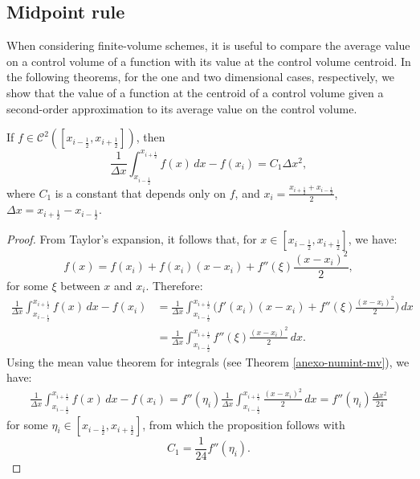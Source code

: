 \subsection{Midpoint rule}
When considering finite-volume schemes, it is useful to compare the average value on a  control volume 
of a function with its value at the  control volume centroid. 
In the following theorems, for the one and two dimensional cases, respectively,
we show that the value of a function at the centroid of a control volume given a second-order approximation to its average value
on the control volume.
\begin{thrm}
	\label{prop-bound-midpoint1d}
	If $f \in \mathcal{C}^2([x_{i-\frac{1}{2}},x_{i+\frac{1}{2}}])$, then 
	\begin{equation}
		\frac{1}{\Delta x}\int_{x_{i-\frac{1}{2}}}^{x_{i+\frac{1}{2}}}{f(x)\,dx}-f(x_i) = C_1 \Delta x^2, 
	\end{equation}
	where $C_1$ is a constant that depends only on $f$, and $x_i = \frac{x_{i+\frac{1}{2}} + x_{i-\frac{1}{2}}}{2}$,
	$\Delta x = x_{i+\frac{1}{2}}-x_{i-\frac{1}{2}}$.
\end{thrm}
\begin{proof}
	From Taylor's expansion, it follows that, for $x \in [x_{i-\frac{1}{2}},x_{i+\frac{1}{2}}]$, we have:
	\begin{equation}
		f(x) = f(x_i) +  f(x_i)(x-x_i) + f''(\xi)\frac{(x-x_i)^2}{2},
	\end{equation}
	for some $\xi$ between $x$ and $x_i$. Therefore:
	\begin{align*}
		\frac{1}{\Delta x} \int_{x_{i-\frac{1}{2}}}^{x_{i+\frac{1}{2}}} {f(x)\,dx} - f(x_i)  
		&= \frac{1}{\Delta x} \int_{x_{i-\frac{1}{2}}}^{x_{i+\frac{1}{2}}} 
		\bigg( f'(x_i)(x-x_i) + f''(\xi)\frac{(x-x_i)^2}{2} \bigg) \,dx \\ 
		&=  \frac{1}{\Delta x} \int_{x_{i-\frac{1}{2}}}^{x_{i+\frac{1}{2}}} 
		f''(\xi)\frac{(x-x_i)^2}{2}  \,dx.
	\end{align*}
	Using the mean value theorem for integrals (see Theorem \ref{anexo-numint-mv}), we have:
	\begin{align*}
		\frac{1}{\Delta x} \int_{x_{i-\frac{1}{2}}}^{x_{i+\frac{1}{2}}} {f(x)\,dx} - f(x_i)  = 
		f''(\eta_i) \frac{1}{\Delta x} \int_{x_{i-\frac{1}{2}}}^{x_{i+\frac{1}{2}}} 
		\frac{(x-x_i)^2}{2}  \,dx = f''(\eta_i)\frac{\Delta x^2}{24}
	\end{align*}	
	for some $\eta_i \in [x_{i-\frac{1}{2}},x_{i+\frac{1}{2}}]$, from which the proposition follows with
	\begin{equation}
		C_1 = \frac{1}{24}f''(\eta_i).
	\end{equation}
\end{proof}

